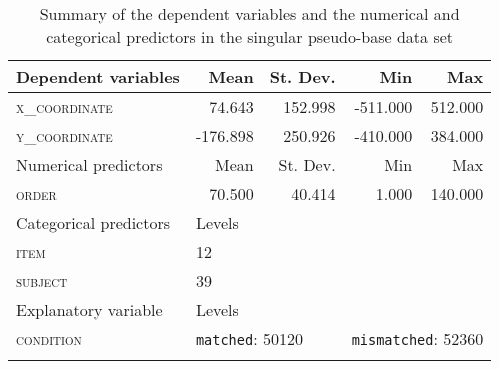 \begin{table}[H]\fontsize{10}{11}
\caption{Summary of the dependent variables and the numerical and categorical predictors in the singular pseudo-base data set}
\label{tab:7.9}
\centering
\begin{tabular}{lrrrr} 
\lsptoprule
Dependent variables    & Mean     & St. Dev.                  & Min      & Max                           \\ 
\midrule
\textsc{x\_coordinate}          & 74.643   & 152.998                   & -511.000 & 512.000                       \\
\textsc{y\_coordinate}          & -176.898 & 250.926                   & -410.000 & 384.000                       \\ 
\midrule
Numerical predictors   & Mean     & St. Dev.                  & Min      & Max                           \\ 
\midrule
\textsc{order}                  & 70.500   & 40.414                    & 1.000    & 140.000                       \\ 
\midrule
Categorical predictors & \multicolumn{1}{l}{Levels}   & ~                         & ~        & ~                             \\ 
\midrule
\textsc{item}                   & \multicolumn{1}{l}{12}       & ~                         & ~        & ~                             \\
\textsc{subject}                & \multicolumn{1}{l}{39}       & ~                         & ~        & ~                             \\ 
\midrule
Explanatory variable   & \multicolumn{1}{l}{Levels}   & ~                         & ~        & ~                             \\ 
\midrule
\textsc{condition}              & \multicolumn{2}{l}{\texttt{matched}:
  50120} & \multicolumn{2}{l}{\texttt{mismatched}:
  52360}  \\
\lspbottomrule
\end{tabular}
\end{table}





